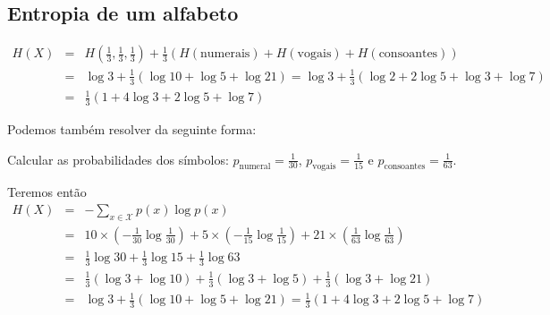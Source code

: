 \subsection{Entropia de um alfabeto}

\begin{questions}

\begin{solution}
  \begin{eqnarray}
  H(X) &=& H \left( \frac{1}{3} , \frac{1}{3} , \frac{1}{3} \right) + \frac{1}{3} \left( H(\text{numerais}) + H(\text{vogais}) + H(\text{consoantes}) \right) \nonumber \\
        &=& \log 3 + \frac{1}{3} \left( \log 10 + \log 5 + \log 21 \right) = \log 3 + \frac{1}{3} \left( \log 2 + 2 \log 5 + \log 3 + \log 7 \right) \nonumber \\
        &=& \frac{1}{3} \left( 1 + 4 \log 3 + 2 \log 5 + \log 7 \right)
  \end{eqnarray}

  Podemos também resolver da seguinte forma:

  Calcular as probabilidades dos símbolos:
  $p_{\text{numeral}} = \frac{1}{30}$, $p_{\text{vogais}} = \frac{1}{15}$ e $p_{\text{consoantes}} = \frac{1}{63}$.

  Teremos então
  \begin{eqnarray}
  H(X) &=&  - \sum_{x \in \mathcal{X}} p(x) \log p(x) \nonumber \\
        &=& 10 \times \left( - \frac{1}{30} \log \frac{1}{30} \right) + 5 \times \left( - \frac{1}{15} \log \frac{1}{15} \right) + 21 \times \left( \frac{1}{63} \log \frac{1}{63} \right) \nonumber \\
        &=& \frac{1}{3} \log 30 + \frac{1}{3} \log 15 + \frac{1}{3} \log 63 \nonumber \\
        &=& \frac{1}{3} ( \log 3 + \log 10 ) + \frac{1}{3} ( \log 3 + \log 5) + \frac{1}{3} (\log 3 + \log 21) \nonumber \\
        &=& \log 3 + \frac{1}{3} ( \log 10 + \log 5 + \log 21 ) = \frac{1}{3} \left( 1 + 4 \log 3 + 2 \log 5 + \log 7 \right)
  \end{eqnarray} 


\end{solution}
\end{questions}
